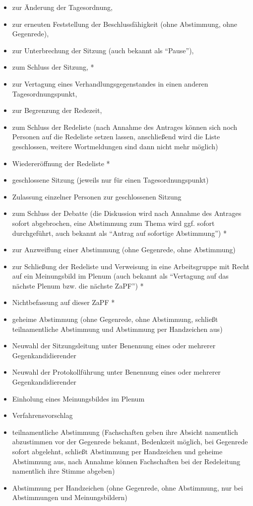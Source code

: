 \documentclass[
  a4paper,
  oneside]{scrartcl}
\providecommand{\tightlist}{%
  \setlength{\itemsep}{0pt}\setlength{\parskip}{0pt}}
\begin{document}
\begin{enumerate}
  \begin{itemize}
  \tightlist
  \item
    zur Änderung der Tagesordnung,
  \item
    zur erneuten Feststellung der Beschlussfähigkeit (ohne Abstimmung,
    ohne Gegenrede),
  \item
    zur Unterbrechung der Sitzung (auch bekannt als ``Pause''),
  \item
    zum Schluss der Sitzung, *
  \item
    zur Vertagung eines Verhandlungsgegenstandes in einen anderen
    Tagesordnungspunkt,
  \item
    zur Begrenzung der Redezeit,
  \item
    zum Schluss der Redeliste (nach Annahme des Antrages können sich
    noch Personen auf die Redeliste setzen lassen, anschließend wird die
    Liste geschlossen, weitere Wortmeldungen sind dann nicht mehr
    möglich)
  \item
    Wiedereröffnung der Redeliste *
  \item
    geschlossene Sitzung (jeweils nur für einen Tagesordnungspunkt)
  \item
    Zulassung einzelner Personen zur geschlossenen Sitzung
  \item
    zum Schluss der Debatte (die Diskussion wird nach Annahme des
    Antrages sofort abgebrochen, eine Abstimmung zum Thema wird ggf.
    sofort durchgeführt, auch bekannt als ``Antrag auf sofortige
    Abstimmung'') *
  \item
    zur Anzweiflung einer Abstimmung (ohne Gegenrede, ohne Abstimmung)
  \item
    zur Schließung der Redeliste und Verweisung in eine Arbeitsgruppe
    mit Recht auf ein Meinungsbild im Plenum (auch bekannt als
    ``Vertagung auf das nächste Plenum bzw. die nächste ZaPF'') *
  \item
    Nichtbefassung auf dieser ZaPF *
  \item
    geheime Abstimmung (ohne Gegenrede, ohne Abstimmung, schließt teilnamentliche Abstimmung und Abstimmung per Handzeichen aus)
  \item
    Neuwahl der Sitzungsleitung unter Benennung eines oder mehrerer
    Gegenkandidierender
  \item
    Neuwahl der Protokollführung unter Benennung eines oder mehrerer
    Gegenkandidierender
  \item
    Einholung eines Meinungsbildes im Plenum
  \item
    Verfahrensvorschlag
  \item
  teilnamentliche Abstimmung (Fachschaften geben ihre Absicht namentlich abzustimmen vor der Gegenrede bekannt, Bedenkzeit möglich, bei Gegenrede sofort abgelehnt, schließt Abstimmung per Handzeichen und geheime Abstimmung aus, nach Annahme können Fachschaften bei der Redeleitung namentlich ihre Stimme abgeben) 
  \item
    Abstimmung per Handzeichen (ohne Gegenrede, ohne Abstimmung, nur bei
    Abstimmungen und Meinungsbildern)
  \end{itemize}


\end{enumerate}
\end{document}
